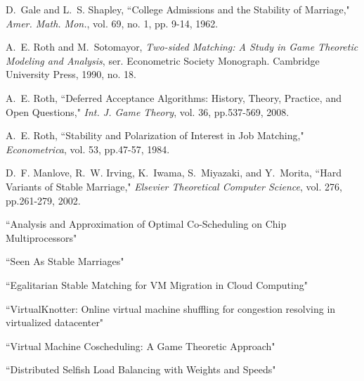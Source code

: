 \documentclass[conference]{IEEEtran}
\begin{document}
%
%
%
\begin{thebibliography}{1}

D.~Gale and L.~S. Shapley, ``College Admissions and the Stability
of Marriage," \emph{Amer. Math. Mon.}, vol. 69, no. 1, pp. 9-14, 1962.

A.~E. Roth and M.~Sotomayor, \emph{Two-sided Matching: A Study in
Game Theoretic Modeling and Analysis}, ser. Econometric Society
Monograph.  Cambridge University Press, 1990, no. 18.

A.~E. Roth, ``Deferred Acceptance Algorithms: History, Theory,
Practice, and Open Questions," \emph{Int. J. Game Theory},
vol. 36, pp.537-569, 2008.

A.~E. Roth, ``Stability and Polarization of Interest in Job
Matching," \emph{Econometrica}, vol. 53, pp.47-57, 1984.

D.~F. Manlove, R.~W. Irving, K.~Iwama, S.~Miyazaki, and Y.~Morita,
 ``Hard Variants of Stable Marriage," \emph{Elsevier Theoretical Computer Science},
vol. 276, pp.261-279, 2002.

``Analysis and Approximation of Optimal Co-Scheduling on Chip Multiprocessors"

``Seen As Stable Marriages"

``Egalitarian Stable Matching for VM Migration in Cloud Computing"

``VirtualKnotter:  Online virtual machine shuffling for congestion resolving in
virtualized datacenter"


``Virtual Machine Coscheduling: A Game Theoretic Approach"

``Distributed Selfish Load Balancing with Weights and Speeds"


\end{thebibliography}




\end{document}
